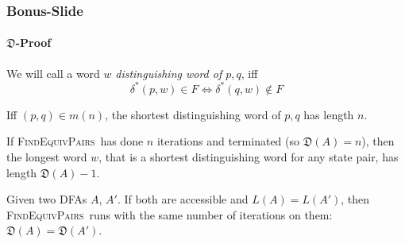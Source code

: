 \documentclass[10pt,usenames,dvipsnames]{beamer}%
\newcommand{\CompDist}{\textsc{FindEquivPairs}}
\newcommand{\mmD}{\mathfrak{D}}
\begin{document}
	\begin{frame}
		\frametitle{Bonus-Slide}
		\framesubtitle{$\mmD$-Proof}
		
		\begin{definition} \label{ch:4:def-dist-word}
			We will call a word $w$ \emph{distinguishing word of $p,q$}, iff
			\[
				\delta^*(p,w) \in F \Leftrightarrow \delta^*(q,w) \notin F		
			\]
		\end{definition}
		\vspace{-0.7cm}
		\begin{lemma}\label{ch:4:semantics-of-m(n)}
			Iff $(p,q)\in m(n)$, the shortest distinguishing word of $p,q$ has length $n$.
		\end{lemma}
	
		\begin{lemma}\label{ch:4:semantics-of-D(A)}
			If \CompDist\ has done $n$ iterations and terminated (so $\mmD(A) = n$), then the longest word $w$, that is a shortest distinguishing word for any state pair, has length $\mmD(A)-1$.
		\end{lemma}
	
		\begin{theorem}\label{ch:4:th-D}
			Given two DFAs $A$, $A'$. If both are accessible and $L(A) = L(A')$, then \CompDist\ runs with the same number of iterations on them: $\mmD(A) = \mmD(A')$.
		\end{theorem}
	
	\end{frame}
%
%		
%				
%				
%				
%				
%				
%				
%				
%				
\end{document}
